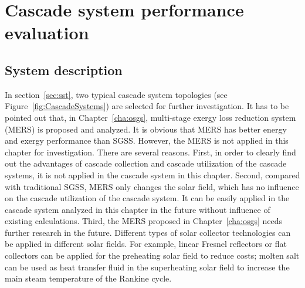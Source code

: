 \chapter{Cascade system performance evaluation}
\section{System description}

In section~\ref{sec:sst}, two typical cascade system topologies (see Figure~\ref{fig:CascadeSystems}) are selected for further investigation. It has to be pointed out that, in Chapter~\ref{cha:osgs}, multi-stage exergy loss reduction system (MERS) is proposed and analyzed. It is obvious that MERS has better energy and exergy performance than SGSS. However, the MERS is not applied in this chapter for investigation. There are several reasons. First,
in order to clearly find out the advantages of cascade collection and cascade utilization of the cascade systems, it is not applied in the cascade system in this chapter. Second, compared with traditional SGSS, MERS only changes the solar field, which has no influence on the cascade utilization of the cascade system. It can be easily applied in the cascade system analyzed in this chapter in the future without influence of existing calculations. Third, the MERS proposed in Chapter~\ref{cha:osgs} needs further research in the future. Different types of solar collector technologies can be applied in different solar fields. For example, linear Fresnel reflectors or flat collectors can be applied for the preheating solar field to reduce costs; molten salt can be used as heat transfer fluid in the superheating solar field to increase the main steam temperature of the Rankine cycle.

